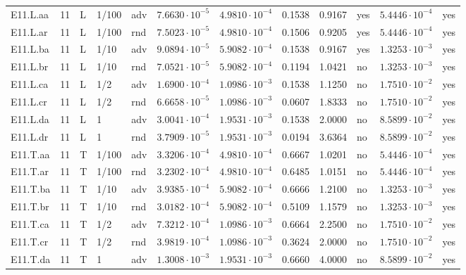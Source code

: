 {\begin{longtable}{@{}lllllllllll l@{}}
E11.L.aa & 11 & L & 1/100 & adv & $7.6630\cdot 10^{-5}$ & $4.9810\cdot 10^{-4}$ & 0.1538 & 0.9167 & yes & $5.4446\cdot 10^{-4}$ & yes \\
E11.L.ar & 11 & L & 1/100 & rnd & $7.5023\cdot 10^{-5}$ & $4.9810\cdot 10^{-4}$ & 0.1506 & 0.9205 & yes & $5.4446\cdot 10^{-4}$ & yes \\
E11.L.ba & 11 & L & 1/10 & adv & $9.0894\cdot 10^{-5}$ & $5.9082\cdot 10^{-4}$ & 0.1538 & 0.9167 & yes & $1.3253\cdot 10^{-3}$ & yes \\
E11.L.br & 11 & L & 1/10 & rnd & $7.0521\cdot 10^{-5}$ & $5.9082\cdot 10^{-4}$ & 0.1194 & 1.0421 & no & $1.3253\cdot 10^{-3}$ & yes \\
E11.L.ca & 11 & L & 1/2 & adv & $1.6900\cdot 10^{-4}$ & $1.0986\cdot 10^{-3}$ & 0.1538 & 1.1250 & no & $1.7510\cdot 10^{-2}$ & yes \\
E11.L.cr & 11 & L & 1/2 & rnd & $6.6658\cdot 10^{-5}$ & $1.0986\cdot 10^{-3}$ & 0.0607 & 1.8333 & no & $1.7510\cdot 10^{-2}$ & yes \\
E11.L.da & 11 & L & 1 & adv & $3.0041\cdot 10^{-4}$ & $1.9531\cdot 10^{-3}$ & 0.1538 & 2.0000 & no & $8.5899\cdot 10^{-2}$ & yes \\
E11.L.dr & 11 & L & 1 & rnd & $3.7909\cdot 10^{-5}$ & $1.9531\cdot 10^{-3}$ & 0.0194 & 3.6364 & no & $8.5899\cdot 10^{-2}$ & yes \\
E11.T.aa & 11 & T & 1/100 & adv & $3.3206\cdot 10^{-4}$ & $4.9810\cdot 10^{-4}$ & 0.6667 & 1.0201 & no & $5.4446\cdot 10^{-4}$ & yes \\
E11.T.ar & 11 & T & 1/100 & rnd & $3.2302\cdot 10^{-4}$ & $4.9810\cdot 10^{-4}$ & 0.6485 & 1.0151 & no & $5.4446\cdot 10^{-4}$ & yes \\
E11.T.ba & 11 & T & 1/10 & adv & $3.9385\cdot 10^{-4}$ & $5.9082\cdot 10^{-4}$ & 0.6666 & 1.2100 & no & $1.3253\cdot 10^{-3}$ & yes \\
E11.T.br & 11 & T & 1/10 & rnd & $3.0182\cdot 10^{-4}$ & $5.9082\cdot 10^{-4}$ & 0.5109 & 1.1579 & no & $1.3253\cdot 10^{-3}$ & yes \\
E11.T.ca & 11 & T & 1/2 & adv & $7.3212\cdot 10^{-4}$ & $1.0986\cdot 10^{-3}$ & 0.6664 & 2.2500 & no & $1.7510\cdot 10^{-2}$ & yes \\
E11.T.cr & 11 & T & 1/2 & rnd & $3.9819\cdot 10^{-4}$ & $1.0986\cdot 10^{-3}$ & 0.3624 & 2.0000 & no & $1.7510\cdot 10^{-2}$ & yes \\
E11.T.da & 11 & T & 1 & adv & $1.3008\cdot 10^{-3}$ & $1.9531\cdot 10^{-3}$ & 0.6660 & 4.0000 & no & $8.5899\cdot 10^{-2}$ & yes \\

\end{longtable}}
